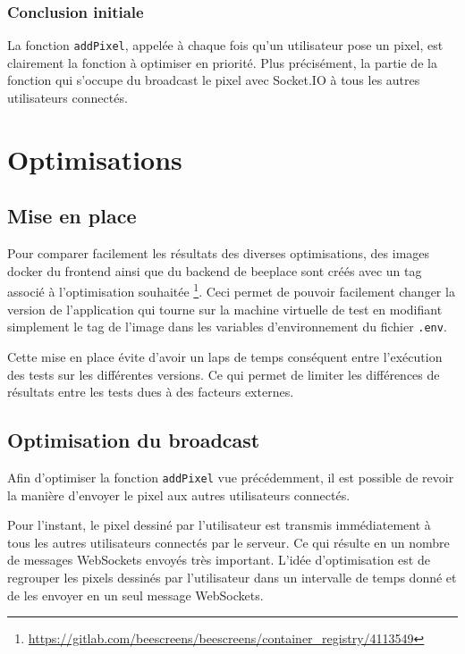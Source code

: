 \subsubsection{Conclusion initiale}

La fonction \texttt{addPixel}, appelée à chaque fois qu'un utilisateur pose un pixel, est clairement la fonction à optimiser en priorité. Plus précisément, la partie de la fonction qui s'occupe du broadcast le pixel avec Socket.IO à tous les autres utilisateurs connectés.

\section{Optimisations}
\label{sec:optimisations}

\subsection{Mise en place}

Pour comparer facilement les résultats des diverses optimisations, des images \gls{docker} du frontend ainsi que du backend de \gls{beeplace} sont créés avec un tag associé à l'optimisation souhaitée \footnote{\url{https://gitlab.com/beescreens/beescreens/container_registry/4113549}}. Ceci permet de pouvoir facilement changer la version de l'application qui tourne sur la machine virtuelle de test en modifiant simplement le tag de l'image dans les variables d'environnement du fichier \texttt{.env}.

Cette mise en place évite d'avoir un laps de temps conséquent entre l'exécution des tests sur les différentes versions. Ce qui permet de limiter les différences de résultats entre les tests dues à des facteurs externes.

\subsection{Optimisation du broadcast}

Afin d'optimiser la fonction \texttt{addPixel} vue précédemment, il est possible de revoir la manière d'envoyer le pixel aux autres utilisateurs connectés.

Pour l'instant, le pixel dessiné par l'utilisateur est transmis immédiatement à tous les autres utilisateurs connectés par le serveur. Ce qui résulte en un nombre de messages WebSockets envoyés très important. L'idée d'optimisation est de regrouper les pixels dessinés par l'utilisateur dans un intervalle de temps donné et de les envoyer en un seul message WebSockets.

